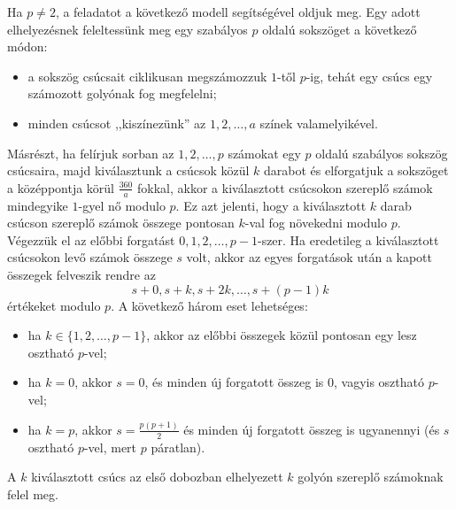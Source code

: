 \documentclass[a4paper,10pt]{article}
\begin{document}
Ha $p\ne 2$, a feladatot a következő modell segítségével
oldjuk meg.
    Egy adott elhelyezésnek feleltess\" unk meg egy szabályos $p$ oldalú  sokszöget a következő módon:
    \begin{itemize}
        \item a sokszög csúcsait ciklikusan megszámozzuk $1$-től $p$-ig, tehát egy csúcs egy számozott golyónak fog megfelelni;
        \item minden csúcsot ,,kiszínez\" unk'' az $1,2,\dots, a$ színek valamelyikével.
    \end{itemize}
    Másrészt, ha felírjuk sorban az $1,2,\dots, p$ számokat egy $p$ oldalú szabályos
     sokszög csú\-csa\-ira, majd kiválasztunk  a csúcsok köz\" ul $k$ darabot és elforgatjuk a sokszöget a
    középpontja kör\" ul $\frac{360}{a}$ fokkal, akkor a kiválasztott csúcsokon
    szereplő számok mindegyike $1$-gyel nő modulo $p$. Ez azt jelenti, hogy a kiválasztott $k$ darab csúcson szereplő számok összege pontosan $k$-val fog növekedni modulo $p$. Végezz\" uk el az előbbi forgatást $0, 1, 2, \dots, p-1$-szer. Ha eredetileg a kiválasztott csúcsokon levő számok összege $s$ volt, akkor az egyes forgatások után a kapott összegek felveszik rendre az
    \begin{equation}\label{eq:1}
        s+0, s +k, s + 2k, \dots, s+(p-1)k
    \end{equation}
    értékeket modulo $p$. A következő három eset lehetséges:
    \begin{itemize}
        \item ha $k\in\{1,2,\dots, p-1\}$, akkor az előbbi összegek köz\" ul pontosan egy lesz osztható $p$-vel;
        \item ha $k = 0$, akkor $s = 0$, és minden új forgatott összeg is $0$, vagyis osztható $p$-vel;
        \item ha $k=p$, akkor $s = \frac{p(p+1)}{2}$ és minden új forgatott összeg is ugyanennyi (és $s$ osztható $p$-vel, mert $p$ páratlan).
    \end{itemize}
     A $k$ kiválasztott csúcs az első dobozban elhelyezett $k$ golyón sze\-rep\-lő számoknak felel meg.
\end{document}
